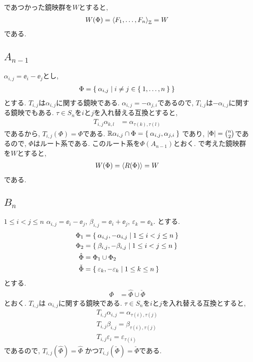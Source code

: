 であつかった鏡映群を$W$とすると,
\begin{align*}
  W(\Phi)=\Braket{F_1,\ldots,F_n}_{\mathbb{Z}}=W
\end{align*}
である.

\subsection{$A_{n-1}$}
\label{ex:an:root}
$\alpha_{i,j}=\ee_i-\ee_j$とし,
\begin{align*}
  \Phi=\Set{\alpha_{i,j}|i\neq j \in \Set{1,\ldots,n}}
\end{align*}
とする.
$T_{i,j}$は$\alpha_{i,j}$に関する鏡映である.
$\alpha_{i,j}=-\alpha_{j,i}$であるので,
$T_{i,j}$は$-\alpha_{i,j}$に関する鏡映でもある.
$\tau\in S_n$を$i$と$j$を入れ替える互換とすると,
\begin{align*}
  T_{i,j}\alpha_{k,l}&=\alpha_{\tau(k),\tau(l)}
\end{align*}
であるから, $T_{i,j}(\Phi)=\Phi$である.
$\mathbb{R}\alpha_{i,j}\cap \Phi=\Set{\alpha_{i,j},\alpha_{j,i}}$
であり,
$\left|\Phi\right|=\binom{n}{2}$であるので,
$\Phi$はルート系である.
このルート系を$\Phi(A_{n-1})$とおく.
で考えた鏡映群を$W$とすると,
\begin{align*}
  W(\Phi)=\Braket{R(\Phi)}=W
\end{align*}
である.

\subsection{$B_{n}$}
\label{ex:bn:root}
$1\leq i<j\leq n$
$\alpha_{i,j}=\ee_i-\ee_j$,
$\beta_{i,j}=\ee_i+\ee_j$,
$\varepsilon_{k}=\ee_k$.
とする.
\begin{align*}
  \Phi_1&=\Set{\alpha_{i,j},-\alpha_{i,j}|1\leq i<j\leq n}\\
  \Phi_2&=\Set{\beta_{i,j},-\beta_{i,j}|1\leq i<j\leq n}\\
  \hat\Phi&=\Phi_1\cup \Phi_2\\
  \check\Phi&=\Set{\varepsilon_k,-\varepsilon_k|1\leq k\leq n}
\end{align*}
とする.
\begin{align*}
  \Phi&=\hat\Phi\cup \check\Phi
\end{align*}
とおく.
$T_{i,j}$は
$\alpha_{i,j}$に関する鏡映である.
$\tau\in S_n$を$i$と$j$を入れ替える互換とすると,
\begin{align*}
  T_{i,j}\alpha_{i,j}=\alpha_{\tau(i),\tau(j)}\\
  T_{i,j}\beta_{i,j}=\beta_{\tau(i),\tau(j)}\\
  T_{i,j}\varepsilon_{i}=\varepsilon_{\tau(i)}
\end{align*}
であるので,
$T_{i,j}(\hat\Phi)=\hat\Phi$
かつ$T_{i,j}(\check\Phi)=\check\Phi$である.

